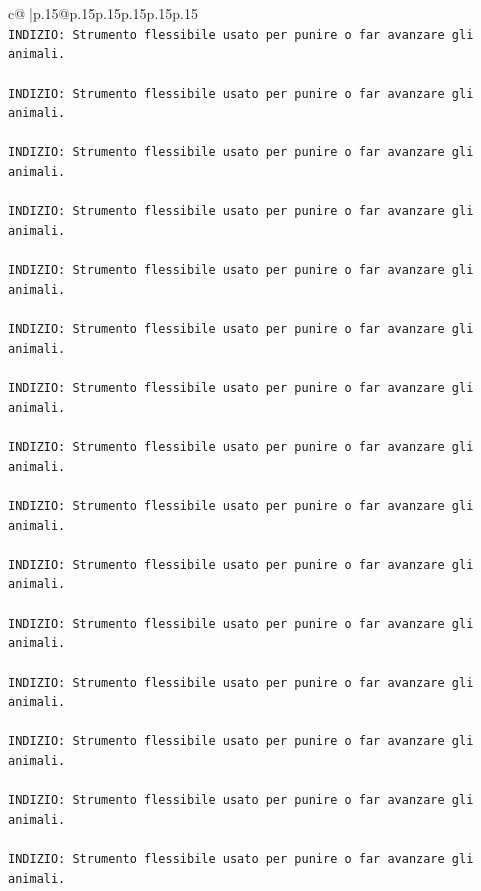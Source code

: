 \documentclass{article}
\begin{document}
{\begin{supertabular}{c@{$\;$}|p{.15\linewidth}@{}p{.15\linewidth}p{.15\linewidth}p{.15\linewidth}p{.15\linewidth}p{.15\linewidth}}
{{{\\ 
\texttt{INDIZIO: Strumento flessibile usato per punire o far avanzare gli animali.} \\
\\ 
\texttt{INDIZIO: Strumento flessibile usato per punire o far avanzare gli animali.} \\
\\ 
\texttt{INDIZIO: Strumento flessibile usato per punire o far avanzare gli animali.} \\
\\ 
\texttt{INDIZIO: Strumento flessibile usato per punire o far avanzare gli animali.} \\
\\ 
\texttt{INDIZIO: Strumento flessibile usato per punire o far avanzare gli animali.} \\
\\ 
\texttt{INDIZIO: Strumento flessibile usato per punire o far avanzare gli animali.} \\
\\ 
\texttt{INDIZIO: Strumento flessibile usato per punire o far avanzare gli animali.} \\
\\ 
\texttt{INDIZIO: Strumento flessibile usato per punire o far avanzare gli animali.} \\
\\ 
\texttt{INDIZIO: Strumento flessibile usato per punire o far avanzare gli animali.} \\
\\ 
\texttt{INDIZIO: Strumento flessibile usato per punire o far avanzare gli animali.} \\
\\ 
\texttt{INDIZIO: Strumento flessibile usato per punire o far avanzare gli animali.} \\
\\ 
\texttt{INDIZIO: Strumento flessibile usato per punire o far avanzare gli animali.} \\
\\ 
\texttt{INDIZIO: Strumento flessibile usato per punire o far avanzare gli animali.} \\
\\ 
\texttt{INDIZIO: Strumento flessibile usato per punire o far avanzare gli animali.} \\
\\ 
\texttt{INDIZIO: Strumento flessibile usato per punire o far avanzare gli animali.} \\
\\ 
}}}
\end{supertabular}}
\end{document}
